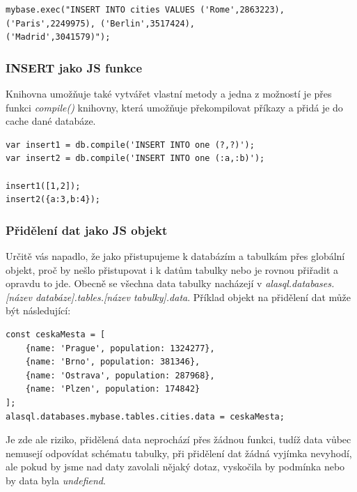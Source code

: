 \documentclass[a4, titlepage]{article}
\begin{document}
\begin{lstlisting}
mybase.exec("INSERT INTO cities VALUES ('Rome',2863223), 
('Paris',2249975), ('Berlin',3517424),  
('Madrid',3041579)");
\end{lstlisting}

\subsubsection*{INSERT jako JS funkce}
Knihovna umožňuje také vytvářet vlastní metody a jedna z možností je přes funkci \textit{compile()} knihovny, která umožňuje překompilovat příkazy a přidá je do cache dané databáze.

\begin{lstlisting}
var insert1 = db.compile('INSERT INTO one (?,?)');
var insert2 = db.compile('INSERT INTO one (:a,:b)');

insert1([1,2]);
insert2({a:3,b:4});
\end{lstlisting}


\subsubsection*{Přidělení dat jako JS objekt}
Určitě vás napadlo, že jako přistupujeme k databázím a tabulkám přes globální objekt, proč by nešlo přistupovat i k datům tabulky nebo je rovnou přiřadit a opravdu to jde. Obecně se všechna data tabulky nacházejí v \textit{alasql.databases.[název databáze].tables.[název tabulky].data}. Příklad objekt na přidělení dat může být následující:

\begin{lstlisting}
const ceskaMesta = [
    {name: 'Prague', population: 1324277},
    {name: 'Brno', population: 381346},
    {name: 'Ostrava', population: 287968},
    {name: 'Plzen', population: 174842}
];
alasql.databases.mybase.tables.cities.data = ceskaMesta;
\end{lstlisting}

Je zde ale riziko, přidělená data neprochází přes žádnou funkci, tudíž data vůbec nemusejí odpovídat schématu tabulky, při přidělení dat žádná vyjímka nevyhodí, ale pokud by jsme nad daty zavolali nějaký dotaz, vyskočila by podmínka nebo by data byla \textit{undefiend}. 
\end{document}

